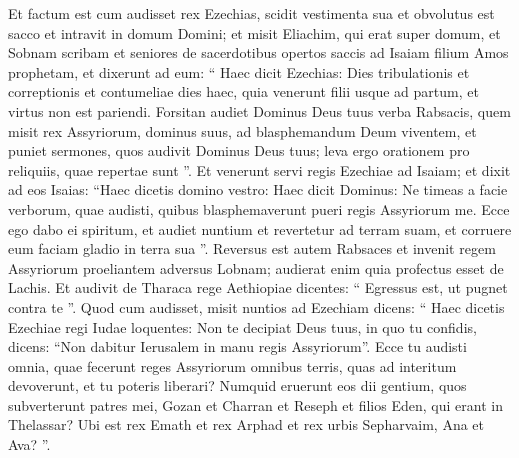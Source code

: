 \begin{biblechapter}
\begin{biblechapter}
\begin{biblechapter}
\begin{biblechapter}
\begin{biblechapter}
\begin{biblechapter}
\begin{biblechapter}
\begin{biblechapter}
\begin{biblechapter}
\begin{biblechapter}
\begin{biblechapter}
\begin{biblechapter}
\begin{biblechapter}
\begin{biblechapter}
\begin{biblechapter}
\begin{biblechapter}
\begin{biblechapter}
\begin{biblechapter}
\begin{biblechapter}
\begin{biblechapter}
\begin{biblechapter}
\begin{biblechapter}
\begin{biblechapter}
\begin{biblechapter}
\begin{biblechapter}
\begin{biblechapter}
\begin{biblechapter}
\begin{biblechapter}
\begin{biblechapter}
\begin{biblechapter}
\begin{biblechapter}
\begin{biblechapter}
\begin{biblechapter}
\begin{biblechapter}
\begin{biblechapter}
\begin{biblechapter}
\begin{biblechapter}
\verse Et factum est cum audisset rex Ezechias, scidit vestimenta sua et obvolutus est sacco et intravit in domum Domini; 
\verse et misit Eliachim, qui erat super domum, et Sobnam scribam et seniores de sacerdotibus opertos saccis ad Isaiam filium Amos prophetam, 
\verse et dixerunt ad eum: “ Haec dicit Ezechias: Dies tribulationis et correptionis et contumeliae dies haec, quia venerunt filii usque ad partum, et virtus non est pariendi. 
\verse Forsitan audiet Dominus Deus tuus verba Rabsacis, quem misit rex Assyriorum, dominus suus, ad blasphemandum Deum viventem, et puniet sermones, quos audivit Dominus Deus tuus; leva ergo orationem pro reliquiis, quae repertae sunt ”.
 \verse Et venerunt servi regis Ezechiae ad Isaiam; 
\verse et dixit ad eos Isaias: “Haec dicetis domino vestro: Haec dicit Dominus: Ne timeas a facie verborum, quae audisti, quibus blasphemaverunt pueri regis Assyriorum me. 
\verse Ecce ego dabo ei spiritum, et audiet nuntium et revertetur ad terram suam, et corruere eum faciam gladio in terra sua ”.
 \verse Reversus est autem Rabsaces et invenit regem Assyriorum proeliantem adversus Lobnam; audierat enim quia profectus esset de Lachis. 
\verse Et audivit de Tharaca rege Aethiopiae dicentes: “ Egressus est, ut pugnet contra te ”.
 Quod cum audisset, misit nuntios ad Ezechiam dicens: 
\verse “ Haec dicetis Ezechiae regi Iudae loquentes: Non te decipiat Deus tuus, in quo tu confidis, dicens: “Non dabitur Ierusalem in manu regis Assyriorum”. 
\verse Ecce tu audisti omnia, quae fecerunt reges Assyriorum omnibus terris, quas ad interitum devoverunt, et tu poteris liberari? 
\verse Numquid eruerunt eos dii gentium, quos subverterunt patres mei, Gozan et Charran et Reseph et filios Eden, qui erant in Thelassar? 
\verse Ubi est rex Emath et rex Arphad et rex urbis Sepharvaim, Ana et Ava? ”.

\end{biblechapter}
\end{biblechapter}
\end{biblechapter}
\end{biblechapter}
\end{biblechapter}
\end{biblechapter}
\end{biblechapter}
\end{biblechapter}
\end{biblechapter}
\end{biblechapter}
\end{biblechapter}
\end{biblechapter}
\end{biblechapter}
\end{biblechapter}
\end{biblechapter}
\end{biblechapter}
\end{biblechapter}
\end{biblechapter}
\end{biblechapter}
\end{biblechapter}
\end{biblechapter}
\end{biblechapter}
\end{biblechapter}
\end{biblechapter}
\end{biblechapter}
\end{biblechapter}
\end{biblechapter}
\end{biblechapter}
\end{biblechapter}
\end{biblechapter}
\end{biblechapter}
\end{biblechapter}
\end{biblechapter}
\end{biblechapter}
\end{biblechapter}
\end{biblechapter}
\end{biblechapter}

